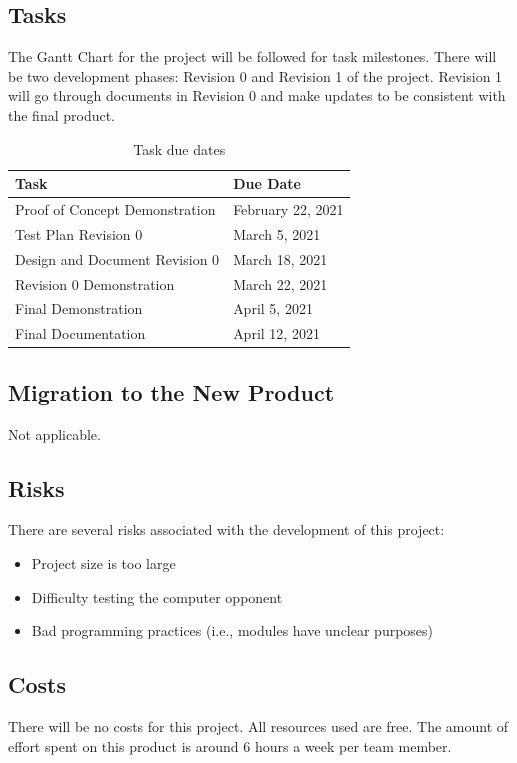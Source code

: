 \documentclass[12pt, titlepage]{article}
\begin{document}
\subsection{Tasks}
The Gantt Chart for the project will be followed for task milestones. There will be two development phases: Revision 0 and Revision 1 of the project. Revision 1 will go through documents in Revision 0 and make updates to be consistent with the final product.

\begin{table}[H]
\caption{Task due dates}
    \centering
    \begin{tabular}{ |p{7.5cm}|p{4.5cm}| }
    \hline
    \textbf{Task} & \textbf{Due Date} \\
    \hline
    Proof of Concept Demonstration & February 22, 2021 \\
    \hline
    Test Plan Revision 0 & March 5, 2021 \\
    \hline
    Design and Document Revision 0 & March 18, 2021 \\
    \hline
    Revision 0 Demonstration & March 22, 2021 \\
    \hline
    Final Demonstration & April 5, 2021 \\
    \hline
    Final Documentation & April 12, 2021 \\
    \hline
    \end{tabular}
\end{table}

\subsection{Migration to the New Product}
Not applicable.

\subsection{Risks}
There are several risks associated with the development of this project:
\begin{itemize}
\item Project size is too large
\item Difficulty testing the computer opponent 
\item Bad programming practices (i.e., modules have unclear purposes)
\end{itemize}

\subsection{Costs}
There will be no costs for this project. All resources used are free. The amount of effort spent on this product is around 6 hours a week per team member. 
\end{document}
